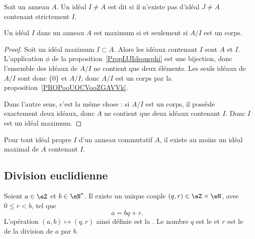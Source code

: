 \begin{definition}      \label{DEFIdealMax}
	Soit un anneau \( A\). Un idéal \( I\neq A\) est dit  si il n'existe pas d'idéal \( J\neq A\) contenant strictement \( I\).
\end{definition}

\begin{proposition}     \label{PROPooSHHWooCyZPPw}
	Un idéal \( I\) dans un anneau \( A \) est maximum si et seulement si \( A/I\) est un corps.
\end{proposition}

\begin{proof}
	Soit un idéal maximum \( I\subset A\). Alors les idéaux contenant \( I\) sont \( A\) et \( I\). L'application \( \phi\) de la proposition~\ref{PropIJJIdsousphi} est une bijection, donc l'ensemble des idéaux de \( A/I\) ne contient que deux éléments. Les seuls idéaux de \( A/I\) sont donc \( \{ 0 \}\) et \( A/I\); donc \( A/I\) est un corps par la proposition~\ref{PROPooUOCVooZGAVVk}.

	Dans l'autre sens, c'est la même chose : si \( A/I\) est un corps, il possède exactement deux idéaux, donc \( A\) ne contient que deux idéaux contenant \( I\). Donc \( I\) est un idéal maximum.
\end{proof}

\begin{theorem}      \label{THOooFWYLooOofaPa}
	Pour tout idéal propre \( I\) d'un anneau commutatif \( A\), il existe au moins un idéal maximal de \( A\) contenant \( I\).
\end{theorem}


\subsection{Division euclidienne}

\begin{theoremDef}     \label{ThoDivisEuclide}
	Soient \( a\in\eZ\) et \( b\in\eN^*\). Il existe un unique couple \( (q,r)\in\eZ\times\eN\), avec \( 0\leq r<b\), tel que
	\begin{equation}
		a=bq+r.
	\end{equation}
	L'opération \( (a,b)\mapsto(q,r)\) ainsi définie est la . Le nombre \( q\) est le  et \( r\) est le  de la division de \( a\) par \( b\).
\end{theoremDef}

